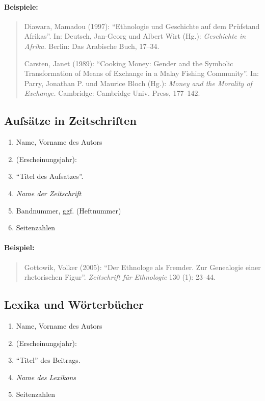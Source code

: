 \documentclass[ 12pt,
                titlepage,
                parskip=half,
                version=first,
                bibliography=totocnumbered,
                final,
                listof=totoc]{scrartcl}
\begin{document}
\paragraph{Beispiele:}
\begin{quote}
Diawara, Mamadou (1997): \enquote{Ethnologie und Geschichte auf dem Prüfstand
Afrikas}. In: Deutsch, Jan-Georg und Albert Wirt (Hg.): \emph{Geschichte in
Afrika.} Berlin: Das Arabische Buch, 17--34.

Carsten, Janet (1989): \enquote{Cooking Money: Gender and the Symbolic
Transformation of Means of Exchange in a Malay Fishing Community}. In: Parry,
Jonathan P. und Maurice Bloch (Hg.): \emph{Money and the Morality of Exchange.}
Cambridge: Cambridge Univ. Press, 177--142.
\end{quote}

\subsection{Aufsätze in Zeitschriften}
\label{sec:sub_aufsätze_in_zeitschriften}

\begin{samepage}
\begin{enumerate}
    \item Name, Vorname des Autors
    \item (Erscheinungsjahr):
    \item \enquote{Titel des Aufsatzes}.
    \item \emph{Name der Zeitschrift}
    \item Bandnummer, ggf. (Heftnummer)
    \item Seitenzahlen
\end{enumerate}
\end{samepage}

\paragraph{Beispiel:}
\begin{quote}
Gottowik, Volker (2005): \enquote{Der Ethnologe als Fremder. Zur Genealogie
einer rhetorischen Figur}. \emph{Zeitschrift für Ethnologie} 130 (1): 23--44.
\end{quote}

\subsection{Lexika und Wörterbücher}
\label{sec:sub_lexika_and_wörterbuch}

\begin{enumerate}
    \item Name, Vorname des Autors
    \item (Erscheinungsjahr):
    \item \enquote{Titel} des Beitrags.
    \item \emph{Name des Lexikons}
    \item Seitenzahlen
\end{enumerate}
\end{document}
